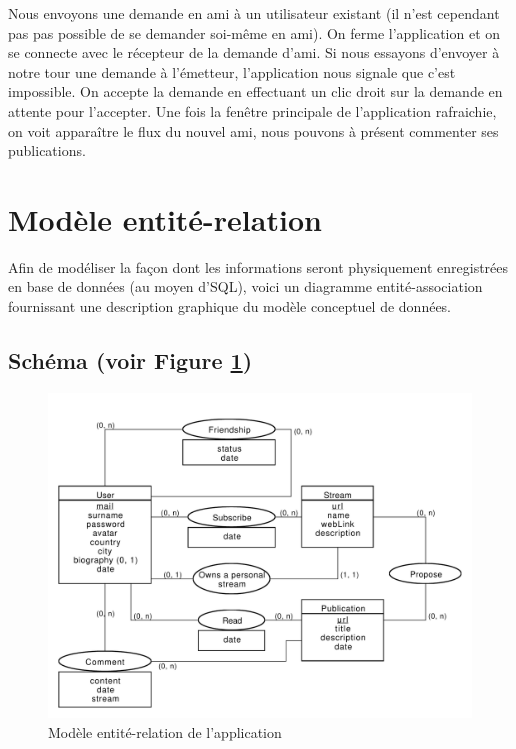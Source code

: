\documentclass[a4paper,10pt]{article}
\begin{document}
Nous envoyons une demande en ami à un utilisateur existant (il n'est cependant pas pas possible de se demander soi-même en ami). On ferme l'application et on se connecte avec le récepteur de la demande d'ami. Si nous essayons d'envoyer à notre tour une demande à l'émetteur, l'application nous signale que c'est impossible. On accepte la demande en effectuant un clic droit sur la demande en attente pour l'accepter. Une fois la fenêtre principale de l'application rafraichie, on voit apparaître le flux du nouvel ami, nous pouvons à présent commenter ses publications. 

\section{Modèle entité-relation}

Afin de modéliser la façon dont les informations seront physiquement enregistrées en base de données (au moyen d'SQL), voici un diagramme entité-association fournissant une description graphique du modèle conceptuel de données.

\subsection{Schéma {\small (voir Figure \ref{fig:Entite-Relation})}} 

	\begin{figure}[h!]
	    \centering
	    \includegraphics[width=15cm]{Entite-Relation-2.pdf}
	    \caption{Modèle entité-relation de l'application}
	    \label{fig:Entite-Relation}
	\end{figure}
\end{document}
